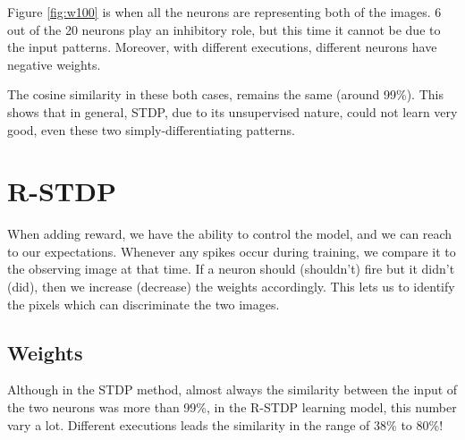 \documentclass{article}
\begin{document}
	Figure \ref{fig:w100} is when all the neurons are representing both of the images. 6 out of the 20 neurons play an inhibitory role, but this time it cannot be due to the input patterns. Moreover, with different executions, different neurons have negative weights.
	
	The cosine similarity in these both cases, remains the same (around 99\%). This shows that in general, STDP, due to its unsupervised nature, could not learn very good, even these two simply-differentiating patterns.
	
	\section{R-STDP}
	When adding reward, we have the ability to control the model, and we can reach to our expectations. Whenever any spikes occur during training, we compare it to the observing image at that time. If a neuron should (shouldn't) fire but it didn't (did), then we increase (decrease) the weights accordingly. This lets us to identify the pixels which can discriminate the two images.
	
	\subsection{Weights}
	Although in the STDP method, almost always the similarity between the input of the two neurons was more than 99\%, in the R-STDP learning model, this number vary a lot. Different executions leads the similarity in the range of 38\% to 80\%!
	
\end{document}

